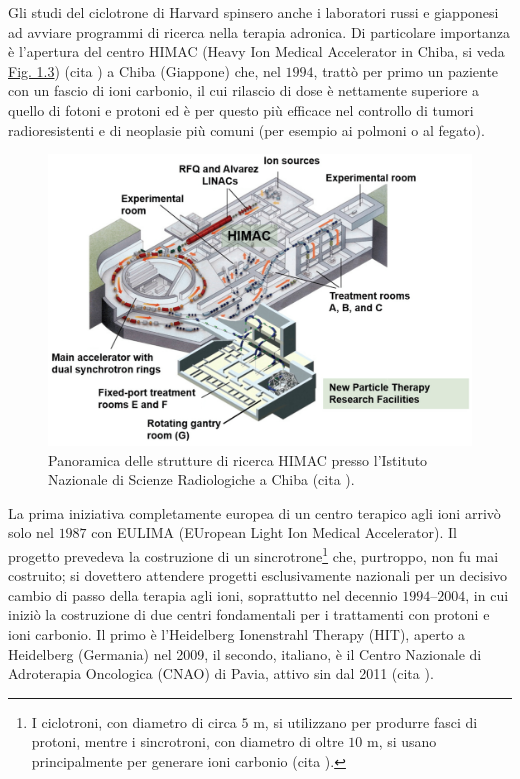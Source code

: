\documentclass[12pt,a4paper,twoside]{report}
\begin{document}
	Gli studi del ciclotrone di Harvard spinsero anche i laboratori russi e giapponesi ad avviare programmi di ricerca nella terapia adronica. Di particolare importanza è l'apertura del centro HIMAC (Heavy Ion Medical Accelerator in Chiba, si veda \hyperref[fig:himac]{Fig. 1.3}) (cita
	) a Chiba (Giappone) che, nel $1994$, trattò per primo un paziente con un fascio di ioni carbonio, il cui rilascio di dose è nettamente superiore a quello di fotoni e protoni ed è per questo più efficace nel controllo di tumori radioresistenti e di neoplasie più comuni (per esempio ai polmoni o al fegato).
	
	\begin{figure}[H]
		\centering
		\includegraphics[width=0.9\linewidth]{images/himac.png}
		\caption{Panoramica delle strutture di ricerca HIMAC presso l'Istituto Nazionale di Scienze Radiologiche a Chiba (cita
			).}
		\label{fig:himac}
	\end{figure}
	
	La prima iniziativa completamente europea di un centro terapico agli ioni arrivò solo nel $1987$ con EULIMA (EUropean Light Ion Medical Accelerator). Il progetto prevedeva la costruzione di un sincrotrone\footnote{I ciclotroni, con diametro di circa $5\mbox{ m}$, si utilizzano per produrre fasci di protoni, mentre i sincrotroni, con diametro di oltre $10\mbox{ m}$, si usano principalmente per generare ioni carbonio (cita
	).} che, purtroppo, non fu mai costruito; si dovettero attendere progetti esclusivamente nazionali per un decisivo cambio di passo della terapia agli ioni, soprattutto nel decennio $1994$--$2004$, in cui iniziò la costruzione di due centri fondamentali per i trattamenti con protoni e ioni carbonio. Il primo è l'Heidelberg Ionenstrahl Therapy (HIT), aperto a Heidelberg (Germania) nel 2009, il secondo, italiano, è il Centro Nazionale di Adroterapia Oncologica (CNAO) di Pavia, attivo sin dal 2011 (cita
	).
	
\end{document}
